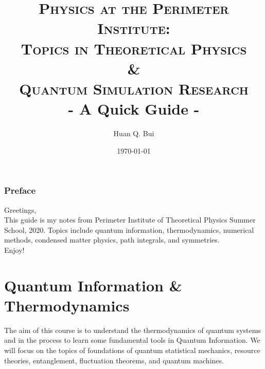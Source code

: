 \documentclass{book}
\theoremstyle{definition}
\begin{document}
\begin{titlepage}\centering
 \clearpage
 \title{{\textsc{\textbf{Physics at the Perimeter Institute:\\  Topics in Theoretical Physics \\ 
 				\&\\ Quantum Simulation Research}}}\\ \smallskip - A Quick Guide - \\}
 \author{\bigskip Huan Q. Bui}
 \date{\today}
 \maketitle
 \thispagestyle{empty}
\end{titlepage}

\subsection*{Preface}

Greetings,\\

This guide is my notes from Perimeter Institute of Theoretical Physics Summer School, 2020. Topics include quantum information, thermodynamics, numerical methods, condensed matter physics, path integrals, and symmetries.\\

Enjoy!  



\newpage
\tableofcontents
\newpage





\chapter{Quantum Information \& Thermodynamics} 

The aim of this course is to understand the thermodynamics of quantum systems and in the process to learn some fundamental tools in Quantum Information. We will focus on the topics of foundations of quantum statistical mechanics, resource theories, entanglement, fluctuation theorems, and quantum machines. 
\end{document}
